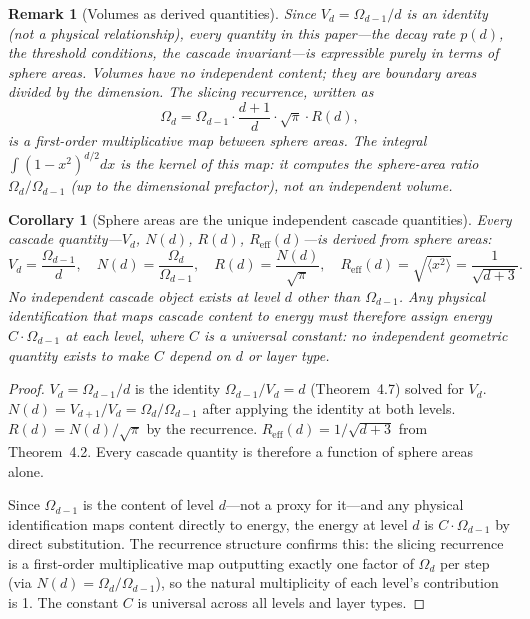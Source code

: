 \documentclass[11pt,a4paper]{article}
\newtheorem{corollary}[theorem]{Corollary}
\newtheorem{remark}[theorem]{Remark}
\begin{document}
\begin{remark}[Volumes as derived quantities]
Since $V_d = \Omega_{d-1}/d$ is an identity (not a physical relationship), every quantity in this paper---the decay rate $p(d)$, the threshold conditions, the cascade invariant---is expressible purely in terms of sphere areas. Volumes have no independent content; they are boundary areas divided by the dimension. The slicing recurrence, written as
\[
\Omega_d = \Omega_{d-1}\cdot\frac{d+1}{d}\cdot\sqrt{\pi}\cdot R(d),
\]
is a first-order multiplicative map between sphere areas. The integral $\int(1-x^2)^{d/2}dx$ is the kernel of this map: it computes the sphere-area ratio $\Omega_d/\Omega_{d-1}$ (up to the dimensional prefactor), not an independent volume.
\end{remark}

\begin{corollary}[Sphere areas are the unique independent cascade quantities]
Every cascade quantity---$V_d$, $N(d)$, $R(d)$, $R_{\mathrm{eff}}(d)$---is derived from sphere areas:
\[
V_d = \frac{\Omega_{d-1}}{d}, \quad N(d) = \frac{\Omega_d}{\Omega_{d-1}}, \quad R(d) = \frac{N(d)}{\sqrt{\pi}}, \quad R_{\mathrm{eff}}(d) = \sqrt{\langle x^2\rangle} = \frac{1}{\sqrt{d+3}}.
\]
No independent cascade object exists at level $d$ other than $\Omega_{d-1}$. Any physical identification that maps cascade content to energy must therefore assign energy $C\cdot\Omega_{d-1}$ at each level, where $C$ is a universal constant: no independent geometric quantity exists to make $C$ depend on $d$ or layer type.
\end{corollary}

\begin{proof}
$V_d = \Omega_{d-1}/d$ is the identity $\Omega_{d-1}/V_d = d$ (Theorem~4.7) solved for $V_d$. $N(d) = V_{d+1}/V_d = \Omega_d/\Omega_{d-1}$ after applying the identity at both levels. $R(d) = N(d)/\sqrt{\pi}$ by the recurrence. $R_{\mathrm{eff}}(d) = 1/\sqrt{d+3}$ from Theorem~4.2. Every cascade quantity is therefore a function of sphere areas alone.

Since $\Omega_{d-1}$ is the content of level $d$---not a proxy for it---and any physical identification maps content directly to energy, the energy at level $d$ is $C\cdot\Omega_{d-1}$ by direct substitution. The recurrence structure confirms this: the slicing recurrence is a first-order multiplicative map outputting exactly one factor of $\Omega_d$ per step (via $N(d) = \Omega_d/\Omega_{d-1}$), so the natural multiplicity of each level's contribution is 1. The constant $C$ is universal across all levels and layer types.
\end{proof}
\end{document}
